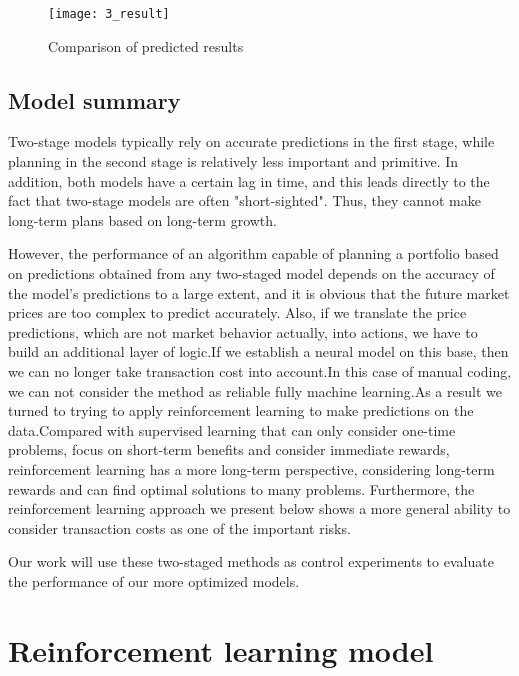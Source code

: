 \documentclass{mcmthesis}
\begin{document}
\begin{figure}[H]
  \centering
  \texttt{[image: 3\_result]}
  \caption{Comparison of predicted results}
  \label{fig:prediction}
\end{figure}
\subsection{Model summary}


Two-stage models typically rely on accurate predictions in the first stage, while planning in the second stage is relatively less important and primitive. In addition, both models have a certain lag in time, and this leads directly to the fact that two-stage models are often "short-sighted". Thus, they cannot make long-term plans based on long-term growth.

However, the performance of an algorithm capable of planning a portfolio based on predictions obtained from any two-staged model depends on the accuracy of the model's predictions to a large extent, and it is obvious that the future market prices are too complex to predict accurately. Also, if we translate the price predictions, which are not market behavior actually, into actions, we have to build an additional layer of logic.If we establish a neural model on this base, then we can no longer take transaction cost into account.In this case of manual coding, we can not consider the method as reliable fully machine learning.As a result we turned to trying to apply reinforcement learning to make predictions on the data.Compared with supervised learning that can only consider one-time problems, focus on short-term benefits and consider immediate rewards, reinforcement learning has a more long-term perspective, considering long-term rewards and can find optimal solutions to many problems. Furthermore, the reinforcement learning approach we present below shows a more general ability to consider transaction costs as one of the important risks.


Our work will use these two-staged methods as control experiments to evaluate the performance of our more optimized models.


\section{Reinforcement learning model}
\end{document}

